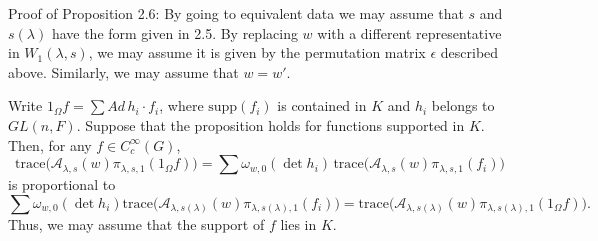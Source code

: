 \documentclass{amsart}
\begin{document}
\pproclaim Proof of Proposition 2.6:
By going to equivalent data we may assume that 
  $s$ and 
  $ s(\lambda) $
have the form given in 2.5.
By replacing $w$ with a different representative in
  $ W_1(\lambda,s) $,
we may assume it is given by the permutation matrix $\epsilon$
described above.
Similarly, we may assume that
  $ w = w' $.

Write
  $ 1_{\Omega} f =
   \sum Ad \, h_i \cdot f_i $,
where
  $ \text {supp} (f_i)$ is contained in $K$
and
  $ h_i$ belongs to $GL(n,F)$.
Suppose that the proposition holds for functions supported in $K$.
Then, for any 
  $ f \in C_c^{\infty}(G) $,
%
$$
  \text{trace}
  \bigl(
    {\mathcal A}_{\lambda,s} (w)
    \pi_{\lambda,s,1}
    (1_{\Omega} f)
  \bigr)
=
  \sum
  \omega_{w,0}
  (\det h_i) \,
  \text{trace}
  \bigl(
    {\mathcal A}_{\lambda,s} (w)
    \pi_{\lambda,s,1}
    (f_i)
  \bigr)
$$
%
is proportional to
%
$$
  \sum  \omega_{w,0}
  ( \det h_i)
  \text{trace}
  \bigl(
    {\mathcal A}_{\lambda,s(\lambda)} (w)
    \pi_{\lambda,s(\lambda),1}
    (f_i)
  \bigr)
=  
  \text{trace}
  \bigl(
    {\mathcal A}_{\lambda,s(\lambda)} (w)
    \pi_{\lambda,s(\lambda),1}
    (1_{\Omega}f)
  \bigr).
$$
%
Thus, we may assume that the support of $f$ lies in $K$.
\end{document}
